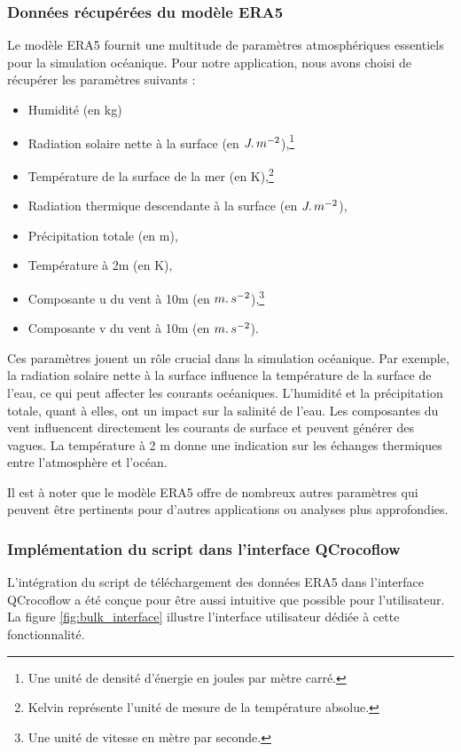 \subsubsection{Données récupérées du modèle ERA5}

Le modèle ERA5 fournit une multitude de paramètres atmosphériques essentiels pour la simulation océanique. Pour notre application, nous avons choisi de récupérer les paramètres suivants :

\begin{itemize}
	\item Humidité (en kg)
	\item Radiation solaire nette à la surface (en $J \ldotp m^{-2}$),\footnote{Une unité de densité d'énergie en joules par mètre carré.}
	\item Température de la surface de la mer (en K),\footnote{Kelvin représente l'unité de mesure de la température absolue.}
	\item Radiation thermique descendante à la surface (en $J \ldotp m^{-2}$),
	\item Précipitation totale (en m),
	\item Température à 2m (en K),
	\item Composante u du vent à 10m (en $m \ldotp s^{-2}$),\footnote{Une unité de vitesse en mètre par seconde.}
	\item Composante v du vent à 10m (en $m \ldotp s^{-2}$).
\end{itemize}

Ces paramètres jouent un rôle crucial dans la simulation océanique. Par exemple, la radiation solaire nette à la surface influence la température de la surface de l'eau, ce qui peut affecter les courants océaniques. L'humidité et la précipitation totale, quant à elles, ont un impact sur la salinité de l'eau. Les composantes du vent influencent directement les courants de surface et peuvent générer des vagues. La température à 2 m donne une indication sur les échanges thermiques entre l'atmosphère et l'océan.

Il est à noter que le modèle ERA5 offre de nombreux autres paramètres qui peuvent être pertinents pour d'autres applications ou analyses plus approfondies.

\subsubsection{Implémentation du script dans l'interface QCrocoflow}

L'intégration du script de téléchargement des données ERA5 dans l'interface QCrocoflow a été conçue pour être aussi intuitive que possible pour l'utilisateur. La figure \ref{fig:bulk_interface} illustre l'interface utilisateur dédiée à cette fonctionnalité.

